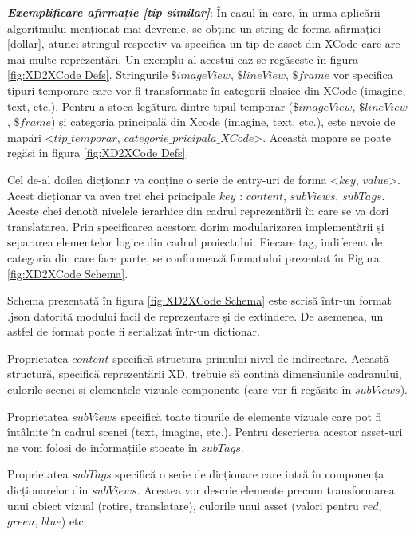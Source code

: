 \textbf{\textit{Exemplificare afirmație \ref{tip similar}}}: În cazul în care, în urma aplicării algoritmului menționat mai devreme, se obține un string de forma afirmației \ref{dollar}, atunci stringul respectiv va specifica un tip de asset din XCode care are mai multe reprezentări. Un exemplu al acestui caz se regăsește în figura \ref{fig:XD2XCode Defs}. Stringurile $\$imageView$, $\$lineView$, $\$frame$ vor specifica tipuri temporare care vor fi transformate în categorii clasice din XCode (imagine, text, etc.). Pentru a stoca legătura dintre tipul temporar ($\$imageView$, $\$lineView$, $\$frame$) și categoria principală din Xcode (imagine, text, etc.), este nevoie de mapări <$tip\_temporar$, $categorie\_pricipala\_XCode$>. Această mapare se poate regăsi în figura \ref{fig:XD2XCode Defs}.

Cel de-al doilea dicționar va conține o serie de entry-uri de forma <$key$, $value$>. Acest dicționar va avea trei chei principale $key$ : $content$, $subViews$, $subTags$. Aceste chei denotă nivelele ierarhice din cadrul reprezentării în care se va dori translatarea. Prin specificarea acestora dorim modularizarea implementării și separarea elementelor logice din cadrul proiectului. Fiecare tag, indiferent de categoria din care face parte, se conformează formatului prezentat în Figura \ref{fig:XD2XCode Schema}.


Schema prezentată în figura \ref{fig:XD2XCode Schema} este scrisă într-un format .json datorită modului facil de reprezentare și de extindere. De asemenea, un astfel de format poate fi serializat într-un dictionar. 

Proprietatea $content$ specifică structura primului nivel de indirectare. Această structură, specifică reprezentării XD,  trebuie să conțină dimensiunile cadranului, culorile scenei și elementele vizuale componente (care vor fi regăsite în $subViews$).

Proprietatea $subViews$ specifică toate tipurile de elemente vizuale care pot fi întâlnite în cadrul scenei (text, imagine, etc.). Pentru descrierea acestor asset-uri ne vom folosi de informațiile stocate în $subTags$.

Proprietatea $subTags$ specifică o serie de dicționare care intră în componența dicționarelor din $subViews$. Acestea vor descrie elemente precum transformarea unui obiect vizual (rotire, translatare), culorile unui asset (valori pentru $red$, $green$, $blue$) etc.

